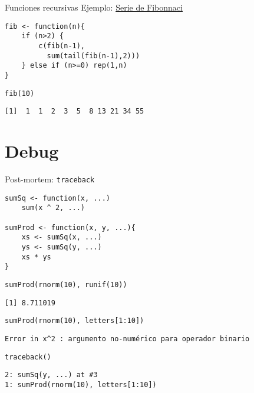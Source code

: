 \documentclass[xcolor={usenames,svgnames,dvipsnames}]{beamer}
\begin{document}
\begin{frame}[label={sec:org73d81ea},fragile]{Funciones recursivas}
 Ejemplo: \href{http://en.wikibooks.org/wiki/R\_Programming/Working\_with\_functions\#Functions\_as\_Objects}{Serie de Fibonnaci}
\lstset{language=r,label= ,caption= ,captionpos=b,numbers=none}
\begin{lstlisting}
fib <- function(n){
    if (n>2) {
        c(fib(n-1),
          sum(tail(fib(n-1),2)))
    } else if (n>=0) rep(1,n)
}
\end{lstlisting}

\lstset{language=r,label= ,caption= ,captionpos=b,numbers=none}
\begin{lstlisting}
fib(10)
\end{lstlisting}

\begin{verbatim}
[1]  1  1  2  3  5  8 13 21 34 55
\end{verbatim}
\end{frame}

\section{Debug}
\label{sec:org2b6fcb0}

\begin{frame}[label={sec:orga900526},fragile]{Post-mortem: \texttt{traceback}}
 \lstset{language=r,label= ,caption= ,captionpos=b,numbers=none}
\begin{lstlisting}
sumSq <- function(x, ...)
    sum(x ^ 2, ...)

sumProd <- function(x, y, ...){
    xs <- sumSq(x, ...)
    ys <- sumSq(y, ...)
    xs * ys
}
\end{lstlisting}

\lstset{language=r,label= ,caption= ,captionpos=b,numbers=none}
\begin{lstlisting}
sumProd(rnorm(10), runif(10))
\end{lstlisting}

\begin{verbatim}
[1] 8.711019
\end{verbatim}


\lstset{language=r,label= ,caption= ,captionpos=b,numbers=none}
\begin{lstlisting}
sumProd(rnorm(10), letters[1:10])
\end{lstlisting}

\begin{verbatim}
Error in x^2 : argumento no-numérico para operador binario
\end{verbatim}


\lstset{language=r,label= ,caption= ,captionpos=b,numbers=none}
\begin{lstlisting}
traceback()
\end{lstlisting}

\begin{verbatim}
2: sumSq(y, ...) at #3
1: sumProd(rnorm(10), letters[1:10])
\end{verbatim}
\end{frame}
\end{document}
